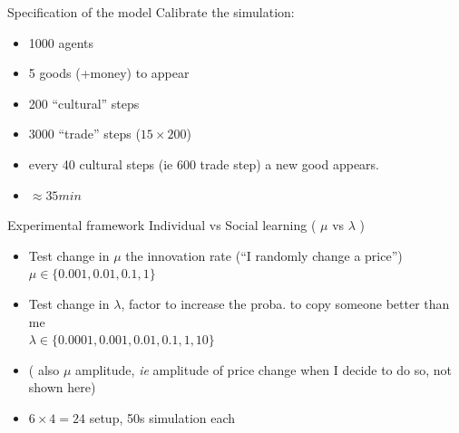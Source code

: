 \documentclass[12pt, notes=show]{beamer}
\begin{document}
\begin{frame}{Specification of the model}
    Calibrate the simulation:
    \begin{itemize}
	\item 1000 agents
	\item 5 goods (+money) to appear 
	\item 200 ``cultural'' steps 
	\item 3000 ``trade'' steps ($15\times200$)
	\item every 40 cultural steps (ie $600$ trade step) a new good appears.
	\item $\approx 35min$
    \end{itemize}
\end{frame}

\begin{frame}{Experimental framework}
Individual  vs Social learning  ( $\mu$ vs $\lambda$ )
    \begin{itemize}
	\item Test change in $\mu$ the innovation rate (``I randomly change a price'')\\
	    \hspace{.2cm} $\mu \in \{0.001,0.01,0.1,1\}$
	\item Test change in $\lambda$, factor to increase the proba. to copy someone better than me\\
	    \hspace{.2cm} $\lambda \in \{0.0001,0.001,0.01,0.1,1,10\}$
	\item ( also $\mu$ amplitude, \emph{ie} amplitude of price change when I decide to do so, not shown here)
	\item  $ 6 \times 4 = 24$ setup, 50s simulation each
    \end{itemize}
\end{frame}
\end{document}
